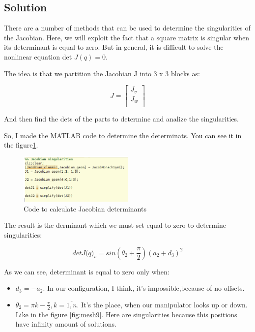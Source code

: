 \documentclass[12pt, a4paper]{report}
\begin{document}
{\centering
\subsection*{Solution}
}


There are a number of methods that can be used to determine the singularities of the Jacobian. Here, we will exploit the fact that a square matrix is singular when its determinant is equal to zero. But in general, it is difficult to solve the nonlinear equation det $J(q) = 0$.

The idea is that we partition the Jacobian J into 3 x 3 blocks as:

\begin{equation}
        J =
        \begin{bmatrix}
                J_{v}\\
               J_{w}\\
        \end{bmatrix}    
\end{equation}

And then find the dets of the parts to determine and analize the singularities.

So, I made the MATLAB code to determine the determinats. You can see it in the figure\ref{fig:mesh8}.

\begin{figure}[H]
	\centering
		\includegraphics[width=0.5\textwidth]{Image8} %
	\caption{Code to calculate Jacobian determinants} %
	\label{fig:mesh8}
\end{figure}


The result is the derminant which we must set equal to zero to determine singularities: 

\begin{equation}
        det{J\bm(q)_{v}} = sin(\theta_2+\frac{\pi}{2})(a_2+d_3)^2
\end{equation}

As we can see, determinant is equal to zero only when:
\begin{itemize}
	\item $d_3 = -a_2$. In our configuration, I think, it's impossible,because of no offsets.
	\item $\theta_2 = {\pi}k-\frac{\pi}{2}, k = \overline{1,n}$. It's the place, when our manipulator looks up or down. Like in the figure \ref{fig:mesh9}. Here are singularities because this positions have infinity amount of solutions.
\end{itemize}
\end{document}
